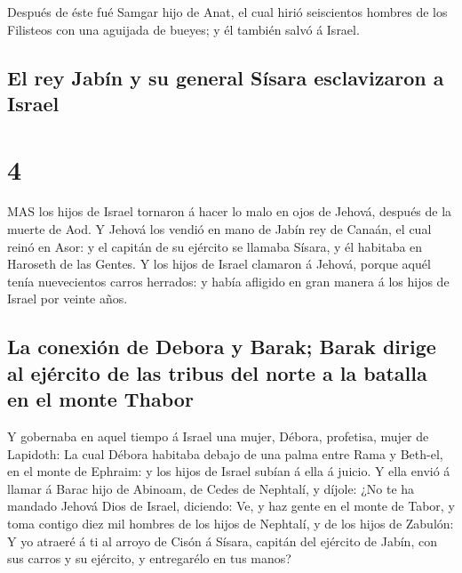  Después de éste fué Samgar hijo de Anat, el cual hirió
seiscientos hombres de los Filisteos con una aguijada de bueyes; y él
también salvó á Israel.

\hypertarget{el-rey-jabuxedn-y-su-general-suxedsara-esclavizaron-a-israel}{%
\subsection{El rey Jabín y su general Sísara esclavizaron a
Israel}\label{el-rey-jabuxedn-y-su-general-suxedsara-esclavizaron-a-israel}}

\hypertarget{section-3}{%
\section{4}\label{section-3}}

 MAS los hijos de Israel tornaron á hacer lo malo en ojos de
Jehová, después de la muerte de Aod.  Y Jehová los vendió en
mano de Jabín rey de Canaán, el cual reinó en Asor: y el capitán de su
ejército se llamaba Sísara, y él habitaba en Haroseth de las Gentes.
 Y los hijos de Israel clamaron á Jehová, porque aquél tenía
nuevecientos carros herrados: y había afligido en gran manera á los
hijos de Israel por veinte años.

\hypertarget{la-conexiuxf3n-de-debora-y-barak-barak-dirige-al-ejuxe9rcito-de-las-tribus-del-norte-a-la-batalla-en-el-monte-thabor}{%
\subsection{La conexión de Debora y Barak; Barak dirige al ejército de
las tribus del norte a la batalla en el monte
Thabor}\label{la-conexiuxf3n-de-debora-y-barak-barak-dirige-al-ejuxe9rcito-de-las-tribus-del-norte-a-la-batalla-en-el-monte-thabor}}

 Y gobernaba en aquel tiempo á Israel una mujer, Débora,
profetisa, mujer de Lapidoth:  La cual Débora habitaba
debajo de una palma entre Rama y Beth-el, en el monte de Ephraim: y los
hijos de Israel subían á ella á juicio.  Y ella envió á
llamar á Barac hijo de Abinoam, de Cedes de Nephtalí, y díjole: ¿No te
ha mandado Jehová Dios de Israel, diciendo: Ve, y haz gente en el monte
de Tabor, y toma contigo diez mil hombres de los hijos de Nephtalí, y de
los hijos de Zabulón:  Y yo atraeré á ti al arroyo de Cisón
á Sísara, capitán del ejército de Jabín, con sus carros y su ejército, y
entregarélo en tus manos?

